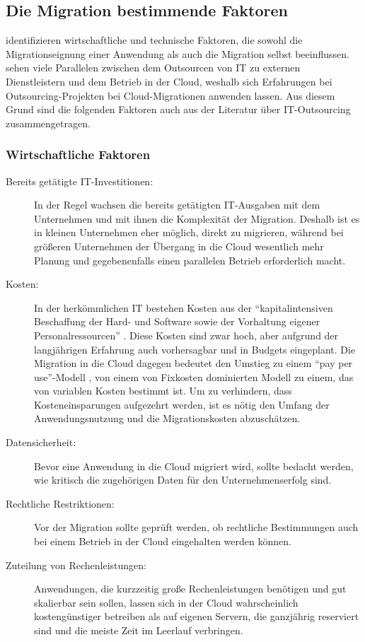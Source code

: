 \subsection{Die Migration bestimmende Faktoren}
\label{cha:migration_bestimmende_faktoren}
 identifizieren wirtschaftliche und technische Faktoren, 
die sowohl die Migrationseignung einer Anwendung als auch die Migration selbst 
beeinflussen. \\
 sehen viele 
Parallelen zwischen dem Outsourcen von IT zu externen 
Dienstleistern und dem Betrieb in der Cloud, weshalb sich Erfahrungen bei 
Outsourcing-Projekten bei Cloud-Migrationen 
anwenden lassen. Aus diesem Grund sind die folgenden Faktoren auch aus der
Literatur über IT-Outsourcing zusammengetragen.
\subsubsection{Wirtschaftliche Faktoren}
\begin{description}
	\item[Bereits getätigte IT-Investitionen:]
	In der Regel wachsen die bereits getätigten IT-Ausgaben mit dem 
Unternehmen und mit ihnen die Komplexität der Migration. Deshalb ist es in 
kleinen Unternehmen eher möglich, direkt zu migrieren, während bei 
größeren Unternehmen der Übergang in die Cloud wesentlich mehr Planung und 
gegebenenfalls einen parallelen Betrieb erforderlich macht.

	\item[Kosten:] In der herkömmlichen IT bestehen Kosten aus der 
"`kapitalintensiven Beschaffung der Hard- und Software sowie der Vorhaltung 
eigener Personalressourcen"' . Diese Kosten sind 
zwar hoch, aber aufgrund der langjährigen Erfahrung auch vorhersagbar und in 
Budgets eingeplant. Die Migration in die Cloud dagegen bedeutet den Umstieg zu 
einem "`pay per use"'-Modell , von einem 
von Fixkosten dominierten Modell zu einem, das von variablen Kosten bestimmt 
ist. 
Um zu verhindern, dass Kosteneinsparungen aufgezehrt werden, ist es nötig 
den Umfang der Anwendungsnutzung und die Migrationskosten abzuschätzen.


	\item[Datensicherheit:] Bevor eine Anwendung in die Cloud migriert 
wird, sollte bedacht werden, wie kritisch die zugehörigen Daten für den 
Unternehmenserfolg sind. 
	\item[Rechtliche Restriktionen:] Vor der Migration sollte geprüft 
werden, ob rechtliche Bestimmungen auch bei einem Betrieb in der Cloud 
eingehalten werden können. 
	\item[Zuteilung von Rechenleistungen:] Anwendungen, die kurzzeitig 
große Rechenleistungen benötigen und gut skalierbar sein sollen, lassen sich in 
der Cloud wahrscheinlich kostengünstiger betreiben als auf eigenen Servern, die 
ganzjährig reserviert sind und die meiste Zeit im Leerlauf verbringen. 
\end{description}


